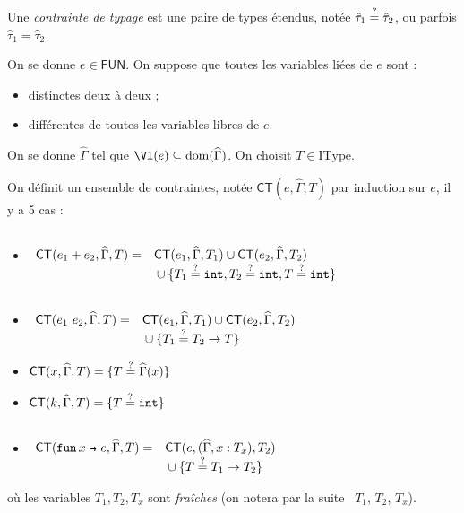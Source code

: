 \documentclass[../main]{subfiles}
\begin{document}
  \begin{defn}
    Une \textit{contrainte de typage} est une paire de types étendus, notée $\hat{\tau}_1 \mathrel{\overset ? =} \hat{\tau}_2$, ou parfois $\hat{\tau}_1 = \hat{\tau}_2$.

    On se donne $e \in \mathsf{FUN}$. On suppose que toutes les variables liées de $e$ sont :
    \begin{itemize}
      \item distinctes deux à deux ;
      \item différentes de toutes les variables libres de $e$.
    \end{itemize}

    On se donne $\widehat{\Gamma}$ tel que $\Vl(e) \subseteq \mathrm{dom}(\widehat{\Gamma})$.
    On choisit $T \in \mathrm{IType}$.

    On définit un ensemble de contraintes, notée $\mathsf{CT}(e, \widehat{\Gamma}, T)$ par induction sur $e$, il y a 5 cas :
    \begin{itemize}
      \item $\begin{array}{rl}\\
          \mathsf{CT}(e_1 + e_2, \widehat{\Gamma}, T) =& \mathsf{CT}(e_1, \widehat{\Gamma}, T_1) \cup \mathsf{CT}(e_2, \widehat{\Gamma}, T_2)\\ &{}\cup \{T_1 \mathrel{\overset ? =} \texttt{int}, T_2 \mathrel{\overset ? =} \texttt{int}, T \mathrel{\overset ? =} \texttt{int}\} 
        \end{array}$
      \item $\begin{array}{rl}\\
          \mathsf{CT}(e_1\ e_2, \widehat{\Gamma}, T) =& \mathsf{CT}(e_1, \widehat{\Gamma}, T_1) \cup \mathsf{CT}(e_2, \widehat{\Gamma}, T_2)\\ &{}\cup \{T_1 \mathrel{\overset ? =} T_2 \to T\} 
        \end{array}$
      \item $\mathsf{CT}(x, \widehat{\Gamma}, T) = \{T \mathrel{\overset ? =} \widehat{\Gamma}(x)\}$ 
      \item $\mathsf{CT}(k, \widehat{\Gamma}, T) = \{T \mathrel{\overset ? =} \texttt{int}\}$ 
      \item $\begin{array}{rl}\\
          \mathsf{CT}(\fun x e, \widehat{\Gamma}, T) =& \mathsf{CT}(e, (\widehat{\Gamma}, x: T_x), T_2)\\ &{}\cup \{T \qeq T_1 \to T_2\} 
        \end{array}$
    \end{itemize}
    où les variables $T_1, T_2, T_x$ sont \textit{fraîches} (on notera par la suite \fresh\ $T_1$, $T_2$, $T_x$).
  \end{defn}
\end{document}
